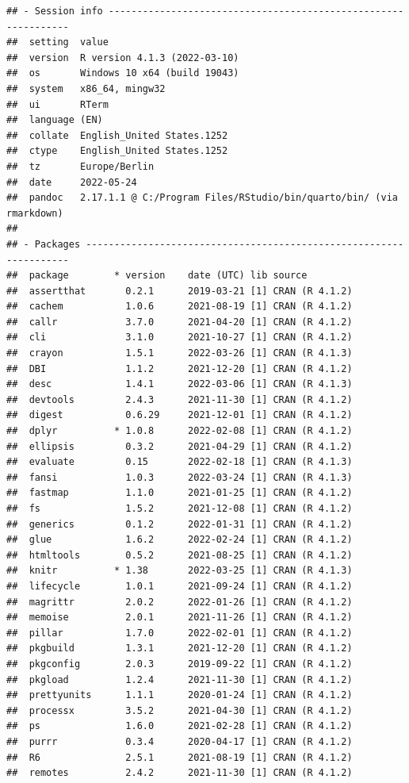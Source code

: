 \documentclass[10,a4paperpaper,]{article}
\begin{document}
\begin{verbatim}
## - Session info ---------------------------------------------------------------
##  setting  value
##  version  R version 4.1.3 (2022-03-10)
##  os       Windows 10 x64 (build 19043)
##  system   x86_64, mingw32
##  ui       RTerm
##  language (EN)
##  collate  English_United States.1252
##  ctype    English_United States.1252
##  tz       Europe/Berlin
##  date     2022-05-24
##  pandoc   2.17.1.1 @ C:/Program Files/RStudio/bin/quarto/bin/ (via rmarkdown)
## 
## - Packages -------------------------------------------------------------------
##  package        * version    date (UTC) lib source
##  assertthat       0.2.1      2019-03-21 [1] CRAN (R 4.1.2)
##  cachem           1.0.6      2021-08-19 [1] CRAN (R 4.1.2)
##  callr            3.7.0      2021-04-20 [1] CRAN (R 4.1.2)
##  cli              3.1.0      2021-10-27 [1] CRAN (R 4.1.2)
##  crayon           1.5.1      2022-03-26 [1] CRAN (R 4.1.3)
##  DBI              1.1.2      2021-12-20 [1] CRAN (R 4.1.2)
##  desc             1.4.1      2022-03-06 [1] CRAN (R 4.1.3)
##  devtools         2.4.3      2021-11-30 [1] CRAN (R 4.1.2)
##  digest           0.6.29     2021-12-01 [1] CRAN (R 4.1.2)
##  dplyr          * 1.0.8      2022-02-08 [1] CRAN (R 4.1.2)
##  ellipsis         0.3.2      2021-04-29 [1] CRAN (R 4.1.2)
##  evaluate         0.15       2022-02-18 [1] CRAN (R 4.1.3)
##  fansi            1.0.3      2022-03-24 [1] CRAN (R 4.1.3)
##  fastmap          1.1.0      2021-01-25 [1] CRAN (R 4.1.2)
##  fs               1.5.2      2021-12-08 [1] CRAN (R 4.1.2)
##  generics         0.1.2      2022-01-31 [1] CRAN (R 4.1.2)
##  glue             1.6.2      2022-02-24 [1] CRAN (R 4.1.2)
##  htmltools        0.5.2      2021-08-25 [1] CRAN (R 4.1.2)
##  knitr          * 1.38       2022-03-25 [1] CRAN (R 4.1.3)
##  lifecycle        1.0.1      2021-09-24 [1] CRAN (R 4.1.2)
##  magrittr         2.0.2      2022-01-26 [1] CRAN (R 4.1.2)
##  memoise          2.0.1      2021-11-26 [1] CRAN (R 4.1.2)
##  pillar           1.7.0      2022-02-01 [1] CRAN (R 4.1.2)
##  pkgbuild         1.3.1      2021-12-20 [1] CRAN (R 4.1.2)
##  pkgconfig        2.0.3      2019-09-22 [1] CRAN (R 4.1.2)
##  pkgload          1.2.4      2021-11-30 [1] CRAN (R 4.1.2)
##  prettyunits      1.1.1      2020-01-24 [1] CRAN (R 4.1.2)
##  processx         3.5.2      2021-04-30 [1] CRAN (R 4.1.2)
##  ps               1.6.0      2021-02-28 [1] CRAN (R 4.1.2)
##  purrr            0.3.4      2020-04-17 [1] CRAN (R 4.1.2)
##  R6               2.5.1      2021-08-19 [1] CRAN (R 4.1.2)
##  remotes          2.4.2      2021-11-30 [1] CRAN (R 4.1.2)

\end{verbatim}
\end{document}
